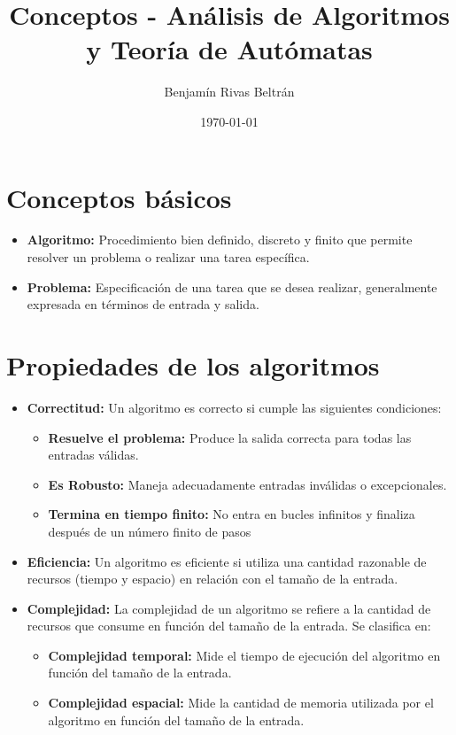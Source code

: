 \documentclass{article}
\title{Conceptos - Análisis de Algoritmos y Teoría de Autómatas}
\author{Benjamín Rivas Beltrán}
\date{\today}
\begin{document}
\maketitle

\section{Conceptos básicos} 

\begin{itemize}
  \item \textbf{Algoritmo:} Procedimiento bien definido, discreto y finito que permite resolver un problema o realizar una tarea específica.
  \item \textbf{Problema:} Especificación de una tarea que se desea realizar, generalmente expresada en términos de entrada y salida.
\end{itemize}

\section{Propiedades de los algoritmos}

\begin{itemize}
  \item \textbf{Correctitud:} Un algoritmo es correcto si cumple las siguientes condiciones:
  \begin{itemize}
    \item \textbf{Resuelve el problema:} Produce la salida correcta para todas las entradas válidas.
    \item \textbf{Es Robusto:} Maneja adecuadamente entradas inválidas o excepcionales.
    \item \textbf{Termina en tiempo finito:} No entra en bucles infinitos y finaliza después de un número finito de pasos
  \end{itemize}

  \item \textbf{Eficiencia:} Un algoritmo es eficiente si utiliza una cantidad razonable de recursos (tiempo y espacio) en relación con el tamaño de la entrada.
  \item \textbf{Complejidad:} La complejidad de un algoritmo se refiere a la cantidad de recursos que consume en función del tamaño de la entrada. Se clasifica en:
  \begin{itemize}
    \item \textbf{Complejidad temporal:} Mide el tiempo de ejecución del algoritmo en función del tamaño de la entrada.
    \item \textbf{Complejidad espacial:} Mide la cantidad de memoria utilizada por el algoritmo en función del tamaño de la entrada.
  \end{itemize}
\end{itemize}
\end{document}

